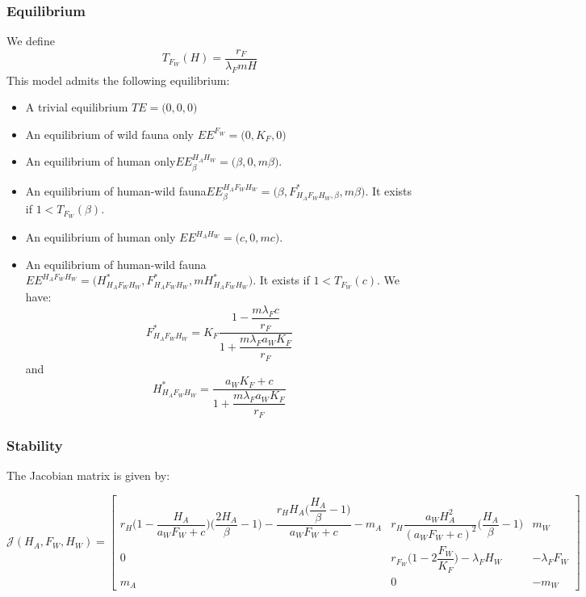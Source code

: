 \documentclass{article}
\newcommand{\lfw}{\lambda_{F}}
\begin{document}
\subsubsection{Equilibrium}
We define 
$$
T_{F_W}(H) = \dfrac{r_F}{\lfw m H}
$$
This model admits the following equilibrium:
\begin{itemize}
\item A trivial equilibrium $TE = \Big(0,0,0\Big)$
\item An equilibrium of wild fauna only $EE^{F_W} = \Big(0,K_F,0\Big)$
\item An equilibrium of human only$EE^{H_AH_W}_\beta = \Big(\beta,0,m \beta \Big)$.
\item An equilibrium of human-wild fauna$EE^{H_AF_WH_W}_\beta = \Big(\beta,F^*_{H_AF_WH_W,\beta},m \beta \Big)$. It exists if $1 < T_{F_W}(\beta)$.
\item An equilibrium of human only $EE^{H_AH_W} = \Big(c,0,m c \Big)$.
\item An equilibrium of human-wild fauna$EE^{H_AF_WH_W} = \Big(H^*_{H_AF_WH_W},F^*_{H_AF_WH_W},m H^*_{H_AF_WH_W} \Big)$. It exists if $1 < T_{F_W}(c)$. We have:
$$F^*_{H_AF_WH_W} = K_F \dfrac{1 - \dfrac{m \lfw c}{r_F}}{1 + \dfrac{m \lfw a_W K_F}{r_F}}$$
and 
$$H^*_{H_AF_WH_W} = \dfrac{a_W K_F + c}{1 + \dfrac{m \lfw a_W K_F}{r_F}}$$
\end{itemize}

\subsubsection{Stability}
The Jacobian matrix is given by:

\begin{equation}
\mathcal{J}(H_A, F_W, H_W) = \begin{bmatrix}
r_H\Big(1-\dfrac{H_A}{a_WF_W+c}\Big)\Big(\dfrac{2H_A}{\beta}-1\Big) - \dfrac{r_H H_A\Big(\dfrac{H_A}{\beta}-1\Big)}{a_WF_W+c} - m_A & r_H \dfrac{a_WH_A^2}{(a_WF_W+c)^2} \Big(\dfrac{H_A}{\beta}-1\Big) & m_W \\
0 & r_{F_W} \Big(1-2\dfrac{F_W}{K_F}\Big) - \lfw H_W & - \lfw F_W \\
m_A & 0 & -m_W
\end{bmatrix}
\end{equation}
\end{document}
